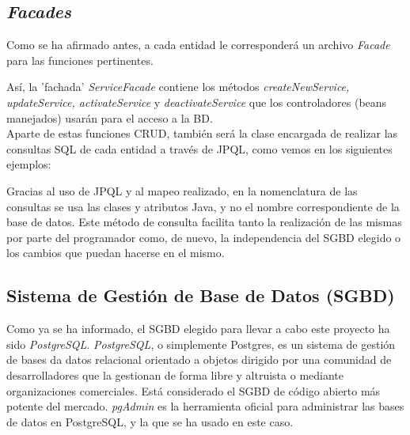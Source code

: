 \subsection{\textit{Facades}}\label{subsec:facades}

Como se ha afirmado antes, a cada entidad le corresponderá un archivo \textit{Facade} para las funciones pertinentes. 



Así, la 'fachada' \textit{ServiceFacade} contiene los métodos \textit{createNewService, updateService, activateService} y \textit{deactivateService} que los controladores (beans manejados) usarán para el acceso a la BD. \\

Aparte de estas funciones CRUD, también será la clase encargada de realizar las consultas SQL de cada entidad a través de JPQL, como vemos en los siguientes ejemplos: 





Gracias al uso de JPQL y al mapeo realizado, en la nomenclatura de las consultas se usa las clases y atributos Java, y no el nombre correspondiente de la base de datos. Este método de consulta facilita tanto la realización de las mismas por parte del programador como, de nuevo, la independencia del SGBD elegido o los cambios que puedan hacerse en el mismo. 


\subsection{Sistema de Gestión de Base de Datos (SGBD)}

Como ya se ha informado, el SGBD elegido para llevar a cabo este proyecto ha sido \textit{PostgreSQL}. \textit{PostgreSQL}, o simplemente Postgres, es un sistema de gestión de bases da datos relacional orientado a objetos dirigido por una comunidad de desarrolladores que la gestionan de forma libre y altruista o mediante organizaciones comerciales. Está considerado el SGBD de código abierto más potente del mercado. \textit{pgAdmin} es la herramienta oficial para administrar las bases de datos en PostgreSQL, y la que se ha usado en este caso. \\

